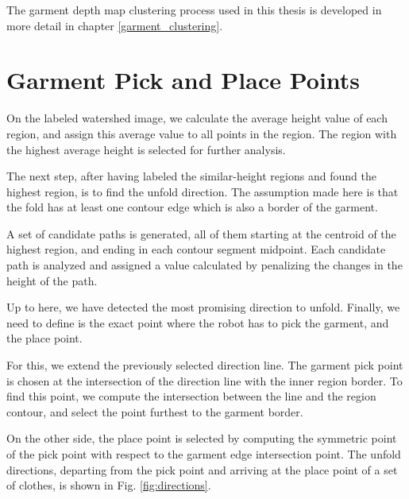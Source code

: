 
The garment depth map clustering process used in this thesis is developed in more detail in chapter \ref{garment_clustering}.

\section{Garment Pick and Place Points}
On the labeled watershed image, we calculate the average height value of each region, and assign this average value to all points in the region. The region with the highest average height is selected for further analysis. 

The next step, after having labeled the similar-height regions and found the highest region, is to find the unfold direction. The assumption made here is that the fold has at least one contour edge which is also a border of the garment. 

A set of candidate paths is generated, all of them starting at the centroid of the highest region, and ending in each contour segment midpoint. Each candidate path is analyzed and assigned a value calculated by penalizing the changes in the height of the path.

Up to here, we have detected the most promising direction to unfold. Finally, we need to define is the exact point where the robot has to pick the garment, and the place point. 

For this, we extend the previously selected direction line. The garment pick point is chosen at the intersection of the direction line with the inner region border. To find this point, we compute the intersection between the line and the region contour, and select the point furthest to the garment border.

On the other side, the place point is selected by computing the symmetric point of the pick point with respect to the garment edge intersection point. The unfold directions, departing from the pick point and arriving at the place point of a set of clothes, is shown in Fig. \ref{fig:directions}.
